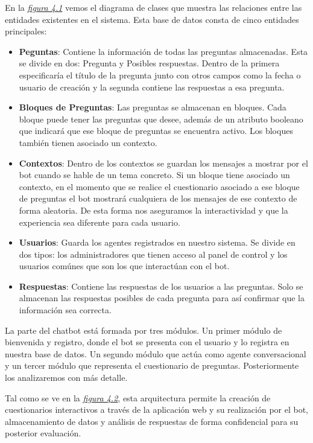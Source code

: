 En la \textit{\hyperref[fig:diagrama]{figura 4.1}} vemos el diagrama de clases que muestra las relaciones entre las entidades existentes en el sistema. Esta base de datos consta de cinco entidades principales:
\begin{itemize}
\item \textbf{Peguntas}: Contiene la información de todas las preguntas almacenadas. Esta se divide en dos: Pregunta y Posibles respuestas. Dentro de la primera especificaría el título de la pregunta junto con otros campos como la fecha o usuario de creación y la segunda contiene las respuestas a esa pregunta. 
\item \textbf{Bloques de Preguntas}: Las preguntas se almacenan en bloques. Cada bloque puede tener las preguntas que desee, además de un atributo booleano que indicará que ese bloque de preguntas se encuentra activo. Los bloques también tienen asociado un contexto. 
\item \textbf{Contextos}: Dentro de los contextos se guardan los mensajes a mostrar por el bot cuando se hable de un tema concreto. Si un bloque tiene asociado un contexto, en el momento que se realice el cuestionario asociado a ese bloque de preguntas el bot mostrará cualquiera de los mensajes de ese contexto de forma aleatoria. De esta forma nos aseguramos la interactividad y que la experiencia sea diferente para cada usuario.
\item \textbf{Usuarios}: Guarda los agentes registrados en nuestro sistema. Se divide en dos tipos: los administradores que tienen acceso al panel de control y los usuarios comúnes que son los que interactúan con el bot.
\item \textbf{Respuestas}: Contiene las respuestas de los usuarios a las preguntas. Solo se almacenan las respuestas posibles de cada pregunta para así confirmar que la información sea correcta.
\end{itemize}

La parte del chatbot está formada por tres módulos. Un primer módulo de bienvenida y registro, donde el bot se presenta con el usuario y lo registra en nuestra base de datos. Un segundo módulo que actúa como agente conversacional y un tercer módulo que representa el cuestionario de preguntas. Posteriormente los analizaremos con más detalle.

Tal como se ve en la \textit{\hyperref[fig:arquitectura]{figura 4.2}}, esta arquitectura permite la creación de cuestionarios interactivos a través de la aplicación web y su realización por el bot, almacenamiento de datos y análisis de respuestas de forma confidencial para su posterior evaluación.

